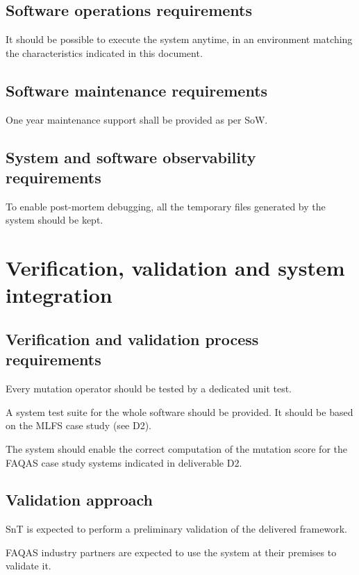 \subsection{Software operations requirements}

\RQ{} It should be possible to execute the system anytime, in an environment matching the characteristics indicated in this document.

\subsection{Software maintenance requirements}

\RQ{} One year maintenance support shall be provided as per SoW.

\subsection{System and software observability requirements}

\RQ{} To enable post-mortem debugging, all the temporary files generated by the system should be kept.

\section{Verification, validation and system integration}
 \subsection{Verification and validation process requirements}
 
 \RQ{} Every mutation operator should be tested by a dedicated unit test.
 
 \RQ{} A system test suite for the whole software should be provided. It should be based on the MLFS case study (see D2).
 
   \RQ{} The system should enable the correct  computation of the mutation score for the FAQAS case study systems indicated in deliverable D2.
 
 \subsection{Validation approach}

\RQ{} SnT is expected to perform a preliminary validation of the delivered framework.

 \RQ{} FAQAS industry partners are expected to use the system at their premises to validate it.
 

%  
% 
%
% 
% 

% 

